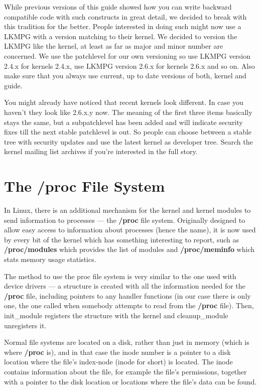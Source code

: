 \documentclass[11pt]{article}
\begin{document}
While previous versions of this guide showed how you can write backward compatible code with such constructs in great detail, we decided to break with this tradition for the better. People interested in doing such might now use a LKMPG with a version matching to their kernel. We decided to version the LKMPG like the kernel, at least as far as major and minor number are concerned. We use the patchlevel for our own versioning so use LKMPG version 2.4.x for kernels 2.4.x, use LKMPG version 2.6.x for kernels 2.6.x and so on. Also make sure that you always use current, up to date versions of both, kernel and guide.

You might already have noticed that recent kernels look different. In case you haven't they look like 2.6.x.y now. The meaning of the first three items basically stays the same, but a subpatchlevel has been added and will indicate security fixes till the next stable patchlevel is out. So people can choose between a stable tree with security updates and use the latest kernel as developer tree. Search the kernel mailing list archives if you're interested in the full story.

\section*{The /proc File System}
\label{sec-7}
In Linux, there is an additional mechanism for the kernel and kernel modules to send information to processes --- the \textbf{/proc} file system. Originally designed to allow easy access to information about processes (hence the name), it is now used by every bit of the kernel which has something interesting to report, such as \textbf{/proc/modules} which provides the list of modules and \textbf{/proc/meminfo} which stats memory usage statistics.

The method to use the proc file system is very similar to the one used with device drivers --- a structure is created with all the information needed for the \textbf{/proc} file, including pointers to any handler functions (in our case there is only one, the one called when somebody attempts to read from the \textbf{/proc} file). Then, init\_module registers the structure with the kernel and cleanup\_module unregisters it.

Normal file systems are located on a disk, rather than just in memory (which is where \textbf{/proc} is), and in that case the inode number is a pointer to a disk location where the file's index-node (inode for short) is located. The inode contains information about the file, for example the file's permissions, together with a pointer to the disk location or locations where the file's data can be found.
\end{document}
